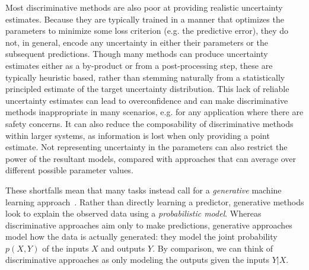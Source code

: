 Most discriminative methods are also poor at providing realistic uncertainty estimates.
Because they are typically trained in a manner that optimizes the parameters to minimize
some loss criterion (e.g. the predictive error), they do not, in general, encode any uncertainty
in either their parameters or the subsequent predictions.  Though many methods can
produce uncertainty estimates either as a by-product or from a post-processing step,
these are typically heuristic based, rather than stemming naturally from a statistically
principled estimate of the target uncertainty distribution.   This lack of reliable uncertainty
estimates can lead to overconfidence and can make discriminative methods inappropriate in
many scenarios, e.g. for any application where there are safety concerns.  
It can also reduce the composability of discriminative methods within
larger systems, as information is lost when only providing a point estimate.
Not representing uncertainty in the parameters can also restrict the power of the resultant
models, compared with approaches that can average over different possible parameter values.

These shortfalls mean that many tasks instead call for a \emph{generative} machine learning
approach~\citep{ng2002discriminative,bishop2006pattern}.  Rather than directly learning a 
predictor, generative methods look to explain the observed data using a \emph{probabilistic model}.
Whereas discriminative approaches aim only to make predictions, generative approaches model
how the data is actually generated: they model the joint probability $p(X,Y)$ of the inputs 
$X$ and outputs $Y$.  By comparison, we can think of discriminative approaches as
only modeling the outputs given the inputs $Y|X$.  

